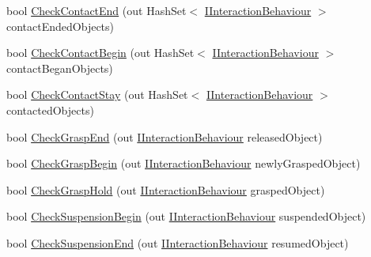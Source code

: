 \begin{DoxyCompactItemize}
\item 
bool \mbox{\hyperlink{interface_leap_1_1_unity_1_1_interaction_1_1_i_internal_interaction_controller_a84c78587d30c7ff285008e20b4e03dee}{Check\+Contact\+End}} (out Hash\+Set$<$ \mbox{\hyperlink{interface_leap_1_1_unity_1_1_interaction_1_1_i_interaction_behaviour}{I\+Interaction\+Behaviour}} $>$ contact\+Ended\+Objects)
\item 
bool \mbox{\hyperlink{interface_leap_1_1_unity_1_1_interaction_1_1_i_internal_interaction_controller_a99417266a54d0379e3ac7434e37ee709}{Check\+Contact\+Begin}} (out Hash\+Set$<$ \mbox{\hyperlink{interface_leap_1_1_unity_1_1_interaction_1_1_i_interaction_behaviour}{I\+Interaction\+Behaviour}} $>$ contact\+Began\+Objects)
\item 
bool \mbox{\hyperlink{interface_leap_1_1_unity_1_1_interaction_1_1_i_internal_interaction_controller_a24357e88230b8982be2faa0b675c2152}{Check\+Contact\+Stay}} (out Hash\+Set$<$ \mbox{\hyperlink{interface_leap_1_1_unity_1_1_interaction_1_1_i_interaction_behaviour}{I\+Interaction\+Behaviour}} $>$ contacted\+Objects)
\item 
bool \mbox{\hyperlink{interface_leap_1_1_unity_1_1_interaction_1_1_i_internal_interaction_controller_a20a159e9b86998c02186e7198bf29dc4}{Check\+Grasp\+End}} (out \mbox{\hyperlink{interface_leap_1_1_unity_1_1_interaction_1_1_i_interaction_behaviour}{I\+Interaction\+Behaviour}} released\+Object)
\item 
bool \mbox{\hyperlink{interface_leap_1_1_unity_1_1_interaction_1_1_i_internal_interaction_controller_ae51b9321dbc3aa38a367be81251f3ad8}{Check\+Grasp\+Begin}} (out \mbox{\hyperlink{interface_leap_1_1_unity_1_1_interaction_1_1_i_interaction_behaviour}{I\+Interaction\+Behaviour}} newly\+Grasped\+Object)
\item 
bool \mbox{\hyperlink{interface_leap_1_1_unity_1_1_interaction_1_1_i_internal_interaction_controller_a4b6e0db263b465625da40783b04811f1}{Check\+Grasp\+Hold}} (out \mbox{\hyperlink{interface_leap_1_1_unity_1_1_interaction_1_1_i_interaction_behaviour}{I\+Interaction\+Behaviour}} grasped\+Object)
\item 
bool \mbox{\hyperlink{interface_leap_1_1_unity_1_1_interaction_1_1_i_internal_interaction_controller_ae3bff050adb927e60128591ebaa225c8}{Check\+Suspension\+Begin}} (out \mbox{\hyperlink{interface_leap_1_1_unity_1_1_interaction_1_1_i_interaction_behaviour}{I\+Interaction\+Behaviour}} suspended\+Object)
\item 
bool \mbox{\hyperlink{interface_leap_1_1_unity_1_1_interaction_1_1_i_internal_interaction_controller_a033ec0c309587a37b6f09766fdedf06d}{Check\+Suspension\+End}} (out \mbox{\hyperlink{interface_leap_1_1_unity_1_1_interaction_1_1_i_interaction_behaviour}{I\+Interaction\+Behaviour}} resumed\+Object)
\end{DoxyCompactItemize}


